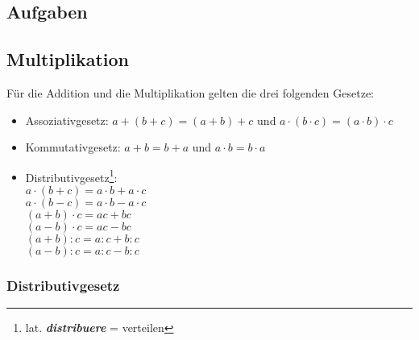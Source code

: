 \newpage

\subsection*{Aufgaben}


\newpage
\subsection{Multiplikation}

Für die Addition und die Multiplikation gelten die drei folgenden
Gesetze:



\begin{gesetz}{}{}
\begin{itemize}
\item  Assoziativgesetz:
  $a+(b+c) = (a+b) +c$ und $a\cdot(b\cdot{}c) = (a\cdot b)\cdot c$
\item Kommutativgesetz:
  $a+b = b+a$ und $a\cdot b = b \cdot a$
\item Distributivgesetz\footnote{lat. \textit{\textbf{distribuere}} = verteilen}:\\
  $a\cdot (b+c) = a\cdot b + a\cdot c$\\
  $a\cdot (b-c) = a\cdot b - a\cdot c$\\
  $(a+b)\cdot c = ac + bc$\\
  $(a-b)\cdot c = ac - bc$\\
  $(a+b):c = a:c + b:c$\\
  $(a-b):c = a:c - b:c$\\
  
  \end{itemize}
\end{gesetz}

\subsubsection{Distributivgesetz}

\newpage

